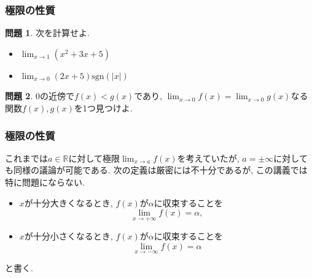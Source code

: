 \documentclass[dvipdfmx,cjk,10.2pt]{beamer}
\newcommand{\R}{\mathbb{R}}
\theoremstyle{definition}
\newtheorem{Thm}{定理}[section]
\newtheorem{Prob}[Thm]{問題}
\begin{document}


%
%
%
%





\begin{frame}
\frametitle{極限の性質} 


\begin{Prob}
次を計算せよ. 
\begin{itemize}
\item $\displaystyle \lim_{x\to 1} (x^2+3x+5)$
\item $\displaystyle \lim_{x\to 0} (2x+5)\mathrm{sgn}(|x|)$
\end{itemize}
\end{Prob}

\begin{Prob} 
$0$の近傍で$f(x)< g(x)$であり, $\displaystyle \lim_{x\to 0}f(x) = \lim_{x\to 0}g(x)$なる関数$f(x),g(x)$を1つ見つけよ.
\end{Prob}


\end{frame}






\begin{frame}
\frametitle{極限の性質} 


これまでは$a \in \R$に対して極限$\displaystyle \lim_{x \to a}f(x)$を考えていたが, $a= \pm \infty$に対しても同様の議論が可能である. 
次の定義は厳密には不十分であるが, この講義では特に問題にならない.  

\begin{itemize}
\item $x$が十分大きくなるとき, $f(x)$が$\alpha$に収束することを
$$
\lim_{x\to +\infty} f(x)=\alpha, 
$$
\item $x$が十分小さくなるとき, $f(x)$が$\alpha$に収束することを
$$
\lim_{x\to -\infty} f(x)=\alpha
$$
\end{itemize}
と書く. 

\end{frame}
\end{document}
